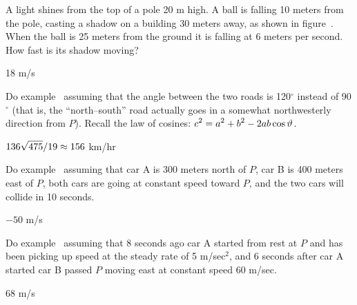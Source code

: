 \begin{exercises}
\begin{exercise}
A light shines from the top of a pole 20 m high. A ball is falling 10
meters from the pole, casting a shadow on a building 30 meters away,
as shown in figure~.
When the ball is 25 meters from the ground it is falling at 6 meters
per second. How fast is its shadow moving?
\begin{answer} 18 m/s
\end{answer}\end{exercise}


\begin{exercise} Do example~ assuming that the angle
between the two roads is 120${}^\circ$ instead of 90${}^\circ$ (that
is, the ``north--south'' road actually goes in a somewhat northwesterly
direction from $P$).  Recall the law of cosines:
$\displaystyle c^2=a^2+b^2-2ab\cos\vartheta$.
\begin{answer} $\displaystyle 136\sqrt{475}/19\approx 156$ km/hr
\end{answer}\end{exercise}

\begin{exercise}
Do example~ assuming that
car A is 300 meters north of $P$, car B is 400 meters east of $P$, both
cars are going at constant speed toward $P$, and the two cars will collide in
10 seconds.
\begin{answer} $-50$ m/s
\end{answer}\end{exercise}

\begin{exercise}
Do example~ assuming that
8 seconds ago car A started from rest at $P$ and has been picking up
speed at the steady rate of 5 m/sec${}^2$, and 6 seconds after car A
started car B passed $P$ moving east at constant speed 60 m/sec.
\begin{answer} $68$ m/s
\end{answer}\end{exercise}


\end{exercises}
